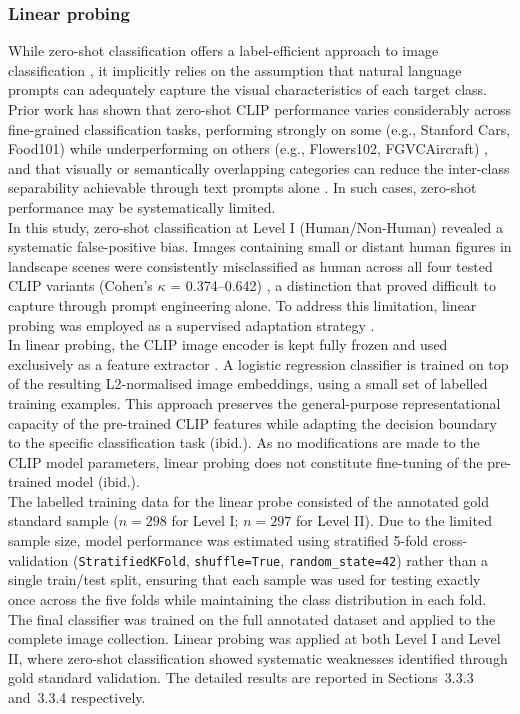 \documentclass[hidelinks, 11pt]{article}
\begin{document}
\subsubsection{Linear probing}
While zero-shot classification offers a label-efficient approach to image classification \citep{liao_mapping_2025}, it implicitly relies on the
assumption that natural language prompts can adequately capture the visual characteristics of each target class. Prior work has shown that zero-shot CLIP performance varies considerably across fine-grained classification tasks, performing strongly on some (e.g., Stanford Cars, Food101) while underperforming on others (e.g., Flowers102, FGVCAircraft) \citep{radford_learning_2021}, and that visually or semantically overlapping categories can reduce the
inter-class separability achievable through text prompts alone \citep{liao_mapping_2025}. In such cases, zero-shot performance may be systematically limited.
\\
In this study, zero-shot classification at Level I (Human/Non-Human) revealed a systematic false-positive bias. Images containing small or distant human figures in landscape scenes were consistently misclassified
as human across all four tested CLIP variants (Cohen's $\kappa$ = 0.374--0.642) \citep{cohen_coefficient_1960}, a distinction that proved difficult to capture through prompt engineering alone. To address this limitation, linear probing was employed as a supervised adaptation strategy \citep{radford_learning_2021}.
\\
In linear probing, the CLIP image encoder is kept fully frozen and used exclusively as a feature extractor \citep{radford_learning_2021}. A logistic regression classifier is trained on top of the resulting
L2-normalised image embeddings, using a small set of labelled training examples. This approach preserves the general-purpose representational capacity of the pre-trained CLIP features while adapting the decision boundary to the specific classification task (ibid.). As no modifications are made to the CLIP model parameters, linear probing does not constitute fine-tuning of the pre-trained model (ibid.).
\\
The labelled training data for the linear probe consisted of the annotated gold standard sample ($n = 298$ for Level I; $n = 297$ for Level II). Due to the limited sample size, model performance was estimated using stratified 5-fold cross-validation (\texttt{StratifiedKFold}, \texttt{shuffle=True}, \texttt{random\_state=42}) rather than a single train/test split, ensuring that each sample was used for testing exactly once across the five folds while maintaining the class distribution in each fold. The final classifier was trained on the full annotated dataset and applied to the complete image collection. Linear probing was applied at both Level I and Level II, where zero-shot classification showed systematic weaknesses identified through gold standard validation. The detailed results are reported in Sections~3.3.3 and~3.3.4 respectively.
\end{document}
